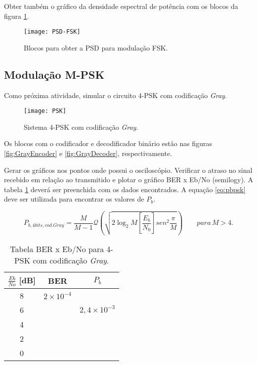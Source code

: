 Obter também o gráfico da densidade espectral de potência com os blocos da figura \ref{fig:PSD-FSK}.

\begin{figure}[H]
    \centering
    \texttt{[image: PSD-FSK]}
    \caption{Blocos para obter a PSD para modulação FSK.}
    \label{fig:PSD-FSK}
\end{figure}

\subsection{Modulação M-PSK}
Como próxima atividade, simular o circuito 4-PSK com codificação \textit{Gray}.

\begin{figure}[H]
    \centering
    \texttt{[image: PSK]}
    \caption{Sistema 4-PSK com codificação \textit{Gray}.}
    \label{fig:FSK}
\end{figure}

Os blocos com o codificador e decodificador binário estão nas figuras \ref{fig:GrayEncoder} e \ref{fig:GrayDecoder}, respectivamente.

Gerar os gráficos nos pontos onde possui o osciloscópio. Verificar o atraso no sinal recebido em relação ao transmitido e plotar o gráfico BER x Eb/No (semilogy). A tabela \ref{tab:3} deverá ser preenchida com os dados encontrados.
A equação \ref{eq:pbpsk} deve ser utilizada para encontrar os valores de $P_b$.


\begin{equation}
\label{eq:pbfsk}
P_{b,4 bits, cod. Gray} = \frac{M}{M-1}\mathcal{Q}\left(\sqrt{2 \log_2 M \left[\frac{E_b}{N_0}\right]sen^2\frac{\pi}{M}} \right) \qquad para \, M > 4.
\end{equation}


\begin{small}
    \begin{table}[H]
        \begin{center}
            \caption{Tabela BER x Eb/No para 4-PSK com codificação \textit{Gray}.}
            \begin{tabular}{c|c|c}
                \hline
                $\frac{Eb}{No}$ [dB] & BER & $P_b$ \\
                \hline
                8 & $2 \times 10^{-4}$ & \\
                \hline
                6 & & $2,4 \times 10^{-3}$ \\
                \hline
                4 & & \\
                \hline
                2 & & \\
                \hline
                0 & & \\
                \hline
            \end{tabular}
            \label{tab:3}
        \end{center}
    \end{table}
\end{small}

